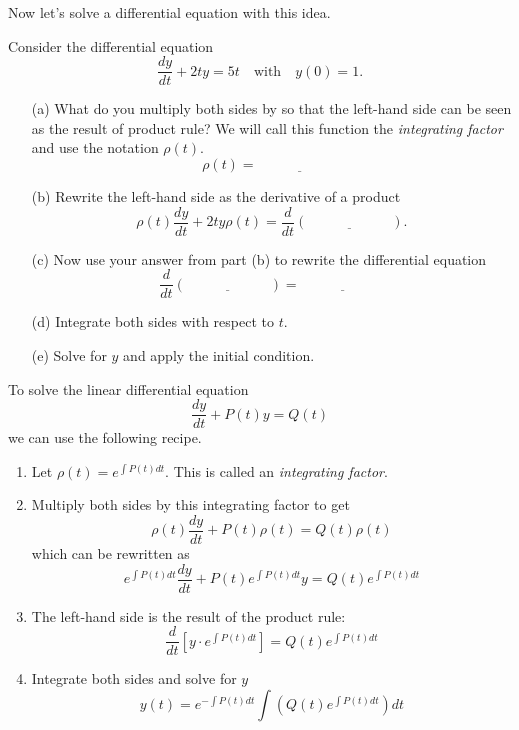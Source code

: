 Now let's solve a differential equation with this idea.
\begin{problem}
    Consider the differential equation
    \[ \frac{dy}{dt} + 2ty = 5t \quad \text{with} \quad y(0) = 1. \]
    \begin{enumerate}
        \item[(a)] What do you multiply both sides by so that the left-hand side can be
            seen as the result of product rule? We will call this function the {\it
            integrating factor} and use the notation $\rho(t)$.
            \[ \rho(t) = \underline{\hspace{1in}} \]
        \item[(b)] Rewrite the left-hand side as the derivative of a product
            \[ \rho(t) \frac{dy}{dt} + 2ty\rho(t) =  \frac{d}{dt} \left( \underline{\hspace{1in}}
            \right). \]
        \item[(c)] Now use your answer from part (b) to rewrite the differential equation
            \[ \frac{d}{dt}\left( \underline{\hspace{1in}} \right) =
            \underline{\hspace{1in}} \]
        \item[(d)] Integrate both sides with respect to $t$.
        \item[(e)] Solve for $y$ and apply the initial condition.
    \end{enumerate}
\end{problem}



\begin{technique}
    To solve the linear differential equation
    \[ \frac{dy}{dt} + P(t) y = Q(t) \]
    we can use the following recipe.  
    \begin{enumerate}
        \item Let $\rho(t) = e^{\int P(t) dt}$.  This is called an {\it integrating factor}.
        \item Multiply both sides by this integrating factor to get
            \[ \rho(t) \frac{dy}{dt} + P(t) \rho(t) = Q(t) \rho(t) \]
            which can be rewritten as
            \[ e^{\int P(t) dt} \frac{dy}{dt} + P(t) e^{\int P(t) dt} y = Q(t) e^{\int P(t)
            dt} \]
        \item The left-hand side is the result of the product rule:
            \[ \frac{d}{dt} \left[ y \cdot e^{\int P(t) dt} \right] = Q(t) e^{\int P(t) dt} \]
        \item Integrate both sides and solve for $y$
            \[ y(t) = e^{-\int P(t) dt} \int \left( Q(t) e^{\int P(t) dt} \right) dt \]
    \end{enumerate}
\end{technique}

